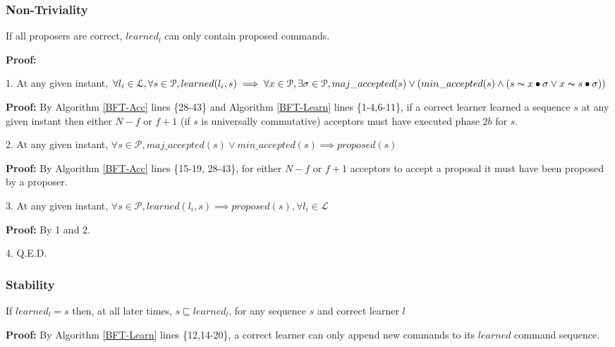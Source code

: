 \subsubsection{Non-Triviality}
\begin{theorem}
If all proposers are correct, $learned_l$ can only contain proposed commands. \label{N-T1} \par
\end{theorem} 
\textbf{Proof:} \par
\parbox{\linewidth}{\strut1. At any given instant, $\forall l_i \in \mathcal{L}, \forall s \in \mathcal{P}, learned(l_i,s) \implies \forall x \in \mathcal{P}, \exists \sigma \in \mathcal{P},  maj\_accepted(s) \lor (min\_accepted(s) \land  (s \thicksim x \bullet \sigma \lor x \thicksim s \bullet \sigma))$ }\par
\indent\indent\parbox{\linewidth}{\strut\textbf{Proof:} By Algorithm \ref{BFT-Acc} lines \{28-43\} and Algorithm \ref{BFT-Learn} lines \{1-4,6-11\}, if a correct learner learned a sequence $s$ at any given instant then either $N-f$ or $f+1$ (if $s$ is universally commutative) acceptors must have executed phase $2b$ for $s$.}\par
\parbox{\linewidth}{\strut2. At any given instant, $\forall s \in \mathcal{P}, maj\_accepted(s) \lor min\_accepted(s) \implies proposed(s)$ }\par
\indent\indent\parbox{\linewidth}{\strut\textbf{Proof:} By Algorithm \ref{BFT-Acc} lines \{15-19, 28-43\}, for either $N-f$ or $f+1$ acceptors to accept a proposal it must have been proposed by a proposer.}\par
\parbox{\linewidth}{\strut3. At any given instant, $\forall s \in \mathcal{P}, learned(l_i,s) \implies proposed(s),\forall l_i \in \mathcal{L}$}\par
\indent\indent\parbox{\linewidth}{\strut\textbf{Proof:} By 1 and 2.}\par
\parbox{\linewidth}{\strut4. Q.E.D.}\par

\subsubsection{Stability}
\begin{theorem}
If $learned_l = s$ then, at all later times, $s \sqsubseteq learned_l$, for any sequence $s$ and correct learner $l$ \par
\end{theorem} 
\textbf{Proof:} By Algorithm \ref{BFT-Learn} lines \{12,14-20\}, a correct learner can only append new commands to its $learned$ command sequence.

